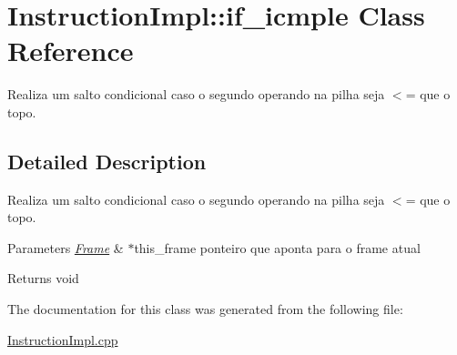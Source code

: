 \hypertarget{class_instruction_impl_1_1if__icmple}{}\section{Instruction\+Impl\+:\+:if\+\_\+icmple Class Reference}
\label{class_instruction_impl_1_1if__icmple}


Realiza um salto condicional caso o segundo operando na pilha seja $<$= que o topo.  




\subsection{Detailed Description}
Realiza um salto condicional caso o segundo operando na pilha seja $<$= que o topo. 


\begin{DoxyParams}{Parameters}
{\em \hyperlink{struct_frame}{Frame}} & $\ast$this\+\_\+frame ponteiro que aponta para o frame atual \\
\hline
\end{DoxyParams}
\begin{DoxyReturn}{Returns}
void 
\end{DoxyReturn}


The documentation for this class was generated from the following file\+:\begin{DoxyCompactItemize}
\item 
\hyperlink{_instruction_impl_8cpp}{Instruction\+Impl.\+cpp}\end{DoxyCompactItemize}
